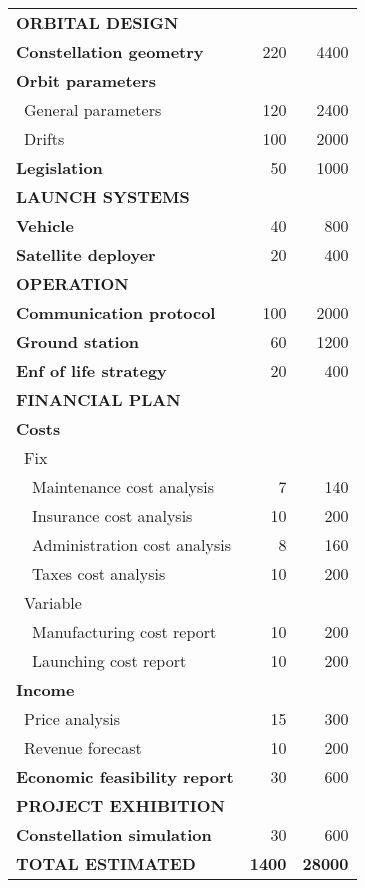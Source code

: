 \begin{longtable}{| l | r | r | }
\rowcolor[gray]{0.85}	\textbf{ORBITAL DESIGN} &  & \\

	\textbf{Constellation geometry} & 220  & 4400  \\
	\hline
	\textbf{Orbit parameters} &   &  \\
	   \blue ~General parameters & 120  & 2400  \\
	   \blue ~Drifts & 100 & 2000  \\
	\hline
	\textbf{Legislation} & 50 & 1000 \\
   
\rowcolor[gray]{0.85} \textbf{LAUNCH SYSTEMS} &  &   \\
	
	\textbf{Vehicle} & 40 & 800 \\
	\hline
	\textbf{Satellite deployer} & 20  & 400 \\

\rowcolor[gray]{0.85} \textbf{OPERATION} &  &  \\
	
	\textbf{Communication protocol} & 100 & 2000\\
	\hline
	\textbf{Ground station} & 60 & 1200 \\
	\hline
	\textbf{Enf of life strategy} & 20  & 400 \\
	\hline

\pagebreak

	\hline
\rowcolor[gray]{0.85} \textbf{FINANCIAL PLAN} &  & \\
	
	\textbf{Costs} & & \\
	   \blue ~Fix &  &   \\
	   ~~Maintenance cost analysis & 7 & 140 \\
	   ~~Insurance cost analysis & 10 & 200 \\
	   ~~Administration cost analysis & 8 & 160 \\
	   ~~Taxes cost analysis & 10 & 200 \\
	   \blue ~Variable &  &  \\
	   ~~Manufacturing cost report & 10 & 200 \\
	   ~~Launching cost report & 10 & 200 \\
	\hline
	\textbf{Income} &   &  \\
	   \blue ~Price analysis & 15  & 300  \\
	   \blue ~Revenue forecast & 10  & 200  \\
	\hline
	\textbf{Economic feasibility report} & 30 & 600 \\

\rowcolor[gray]{0.85} \textbf{PROJECT EXHIBITION} & &  \\

	\textbf{Constellation simulation} & 30 & 600 \\


\rowcolor[gray]{0.65} \textbf{TOTAL ESTIMATED} & \textbf{1400} & \textbf{28000} \\
       \hline

\end{longtable}

